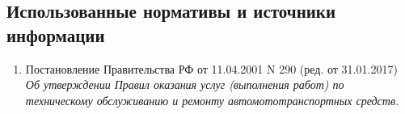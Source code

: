 
\subsection{Использованные нормативы и источники информации}
%
\begin{enumerate}
%	
%
%
%
%
%
%
%
%
%
%
%
\item 
Постановление Правительства РФ от 11.04.2001 N 290 (ред. от 31.01.2017) \emph{Об утверждении Правил оказания услуг (выполнения работ) по техническому обслуживанию и ремонту автомототранспортных средств.}


\end{enumerate}
